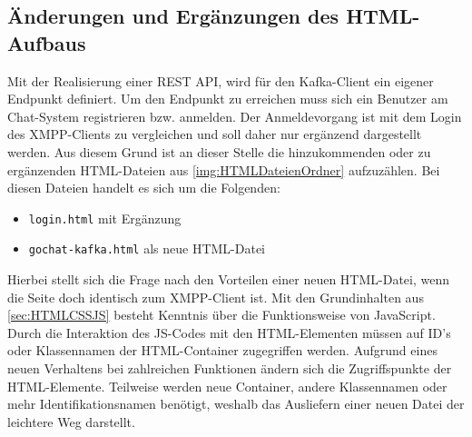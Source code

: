 \documentclass[a4paper,titlepage,halfparskip,12pt]{scrreprt}
\begin{document}
\begin{onehalfspacing}
\section{Änderungen und Ergänzungen des HTML-Aufbaus}
\label{subsec:KafkaHTML}
Mit der Realisierung einer REST API, wird für den Kafka-Client ein eigener Endpunkt definiert. Um den Endpunkt zu erreichen muss sich ein Benutzer am Chat-System registrieren bzw. anmelden. Der Anmeldevorgang ist mit dem Login des XMPP-Clients zu vergleichen und soll daher nur ergänzend dargestellt werden. Aus diesem Grund ist an dieser Stelle die hinzukommenden oder zu ergänzenden HTML-Dateien aus \autoref{img:HTMLDateienOrdner} aufzuzählen. Bei diesen Dateien handelt es sich um die Folgenden:
\begin{itemize}
	\item \texttt{login.html} mit Ergänzung
	\item \texttt{gochat-kafka.html} als neue HTML-Datei
\end{itemize}
Hierbei stellt sich die Frage nach den Vorteilen einer neuen HTML-Datei, wenn die Seite doch identisch zum XMPP-Client ist. Mit den Grundinhalten aus \autoref{sec:HTMLCSSJS} besteht Kenntnis über die Funktionsweise von JavaScript. Durch die Interaktion des JS-Codes mit den HTML-Elementen müssen auf ID's oder Klassennamen der HTML-Container zugegriffen werden. Aufgrund eines neuen Verhaltens bei zahlreichen Funktionen ändern sich die Zugriffspunkte der HTML-Elemente. Teilweise werden neue Container, andere Klassennamen oder mehr Identifikationsnamen benötigt, weshalb das Ausliefern einer neuen Datei der leichtere Weg darstellt. 


\end{onehalfspacing}
\end{document}
